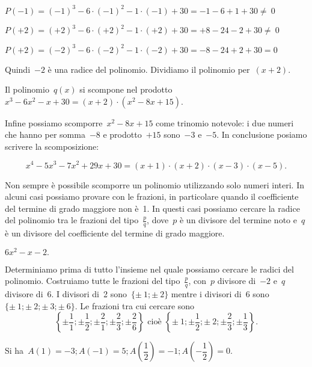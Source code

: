 \(P(-1)=(-1)^{3}-6\cdot (-1)^{2}-1\cdot (-1)+30=-1-6+1+30\neq~0\)

\(P(+2)=(+2)^{3}-6\cdot (+2)^{2}-1\cdot (+2)+30=+8-24-2+30\neq~0\)

\(P(+2)=(-2)^{3}-6\cdot (-2)^{2}-1\cdot (-2)+30=-8-24+2+30=0\)

\begin{multicols}{2}
 
Quindi~\(-2\) è una radice del polinomio. Dividiamo il polinomio per~\((x+2)\).
\begin{center}
 
\end{center}

\end{multicols}

Il polinomio~\(q(x)\) si scompone nel
prodotto~\(x^{3}-6x^{2}-x+30=(x+2)\cdot (x^{2}-8x+15)\).

Infine possiamo scomporre~\(x^{2}-8x+15\) come trinomio notevole: i due
numeri che hanno per somma~\(-8\) e prodotto~\(+15\) sono~\(-3\) e~\(-5\). In
conclusione posiamo scrivere la scomposizione:

\[x^{4}-5x^{3}-7x^{2}+29x+30=(x+1)\cdot (x+2)\cdot (x-3)\cdot (x-5).\]

Non sempre è possibile scomporre un polinomio utilizzando solo numeri
interi. In alcuni casi possiamo provare con le frazioni, in particolare
quando il coefficiente del termine di grado maggiore non è~1. In
questi casi possiamo cercare la radice del polinomio tra le frazioni
del tipo~\(\frac{p}{q}\), dove~\(p\) è un divisore del termine noto e~\(q\) è
un divisore del coefficiente del termine di grado maggiore.


\begin{esempio}
\(6x^{2}-x-2.\)
\end{esempio}

Determiniamo prima di tutto l'insieme nel quale
possiamo cercare le radici del polinomio. Costruiamo tutte le frazioni
del tipo~\(\frac{p}{q}\), con~\(p\) divisore di~\(-2\) e~\(q\) divisore di~\(6\). I
divisori di~2 sono~\(\{\pm~1;\pm~2\}\) 
mentre i divisori di~6 sono~\(\{\pm~1;\pm~2;\pm~3;\pm~6\}\).
Le frazioni tra cui cercare sono
\[\left\{\pm {\frac{1}{1}};\pm \frac{1}{2};\pm \frac{2}{1};\pm
\frac{2}{3};\pm \frac{2}{6}\right\}
\text{ cioè }
\left\{\pm~1;\pm\frac{1}{2};\pm~2;\pm \frac{2}{3};\pm \frac{1}{3}\right\}.\]

Si ha~\(A(1)=-3; A(-1)=5; A\left(\dfrac{1}{2}\right)=
       -1; A\left(-{\dfrac{1}{2}}\right)=0\).

